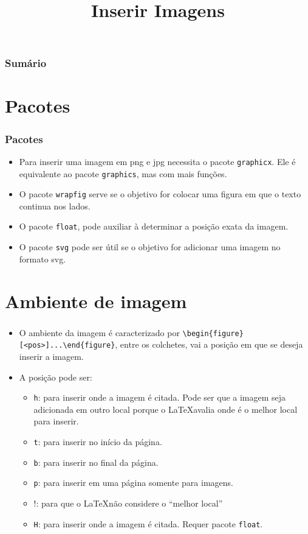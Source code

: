 \documentclass[brazilian]{beamer}
\title{Inserir Imagens}
\begin{document}
\frame{\titlepage}

\begin{frame}
    \frametitle{Sumário}
    \tableofcontents
\end{frame}

\section{Pacotes}

\begin{frame}[fragile]
    \frametitle{Pacotes}

    \begin{itemize}
        \item Para inserir uma imagem em png e jpg necessita o pacote \texttt{graphicx}. Ele é equivalente ao pacote \texttt{graphics}, mas com mais funções.
        \item O pacote \texttt{wrapfig} serve se o objetivo for colocar uma figura em que o texto continua nos lados.
        \item O pacote \texttt{float}, pode auxiliar à determinar a posição exata da imagem.
        \item O pacote \texttt{svg} pode ser útil se o objetivo for adicionar uma imagem no formato svg.
    \end{itemize}

\end{frame}

\section{Ambiente de imagem}

\begin{frame}[fragile]
    \frametitle{}
    \begin{itemize}
        \item O ambiente da imagem é caracterizado por \lstinline[style=myStyleLatex]!\begin{figure}[<pos>]...\end{figure}!, entre os colchetes, vai a posição em que se deseja inserir a imagem.
        \item A posição pode ser:
              \begin{itemize}
                  \item \texttt{h}: para inserir onde a imagem é citada. Pode ser que a imagem seja adicionada em outro local porque o \LaTeX avalia onde é o melhor local para inserir.
                  \item \texttt{t}: para inserir no início da página.
                  \item \texttt{b}: para inserir no final da página.
                  \item \texttt{p}: para inserir em uma página somente para imagens.
                  \item !: para que o \LaTeX não considere o ``melhor local''
                  \item \texttt{H}: para inserir onde a imagem é citada. Requer pacote \texttt{float}.
              \end{itemize}
    \end{itemize}
\end{frame}
\end{document}
